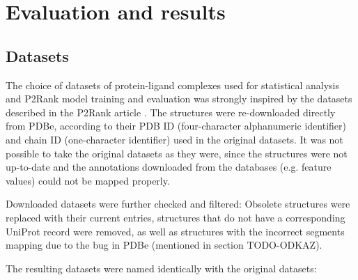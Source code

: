 \chapter{Evaluation and results}


\section{Datasets}


The choice of datasets of protein-ligand complexes used for statistical analysis and P2Rank model training and evaluation was strongly inspired by the datasets described in the P2Rank article \cite{p2rank1}. The structures were re-downloaded directly from PDBe, according to their PDB ID (four-character alphanumeric identifier) and chain ID (one-character identifier) used in the original datasets. It was not possible to take the original datasets as they were, since the structures were not up-to-date and the annotations downloaded from the databases (e.g. feature values) could not be mapped properly.

Downloaded datasets were further checked and filtered: Obsolete structures were replaced with their current entries, structures that do not have a corresponding UniProt record were removed, as well as  structures with the incorrect segments mapping due to the bug in PDBe (mentioned in section TODO-ODKAZ).


The resulting datasets were named identically with the original datasets:

